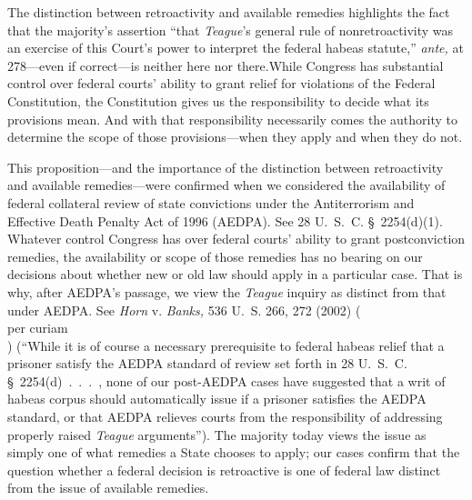 {  The distinction between retroactivity and available remedies highlights the fact that the majority's assertion ``that \emph{Teague}'s general rule of nonretroactivity was an exercise of this Court's power to interpret the federal habeas statute,'' \emph{ante,} at 278---even if correct---is neither here nor there.\footnotemark[4] \newpage While Congress has substantial control over federal courts' ability to grant relief for violations of the Federal Constitution, the Constitution gives us the responsibility to decide what its provisions mean. And with that responsibility necessarily comes the authority to determine the scope of those provisions---when they apply and when they do not.


  This proposition---and the importance of the distinction between retroactivity and available remedies---were confirmed when we considered the availability of federal collateral review of state convictions under the Antiterrorism and Effective Death Penalty Act of 1996 (AEDPA). See 28 U.~S.~C. \S~2254(d)(1). Whatever control Congress has over federal courts' ability to grant postconviction remedies, the availability or scope of those remedies has no bearing on our decisions about whether new or old law should apply in a particular case. That is why, after AEDPA's passage, we view the \emph{Teague} inquiry as distinct from that under AEDPA. See \emph{Horn} v. \emph{Banks,} 536 U.~S. 266, 272 (2002) (\\per curiam\\) (``While it is of course a necessary prerequisite to federal habeas relief that a prisoner satisfy the AEDPA standard of review set forth in 28 U.~S.~C. \S~2254(d)~.~.~.~, none of our post-AEDPA cases have suggested that a writ of habeas corpus should automatically issue if a prisoner satisfies the AEDPA standard, or that AEDPA relieves courts from the responsibility of addressing properly raised \emph{Teague} arguments''). The majority today views the issue as simply one of what remedies a State chooses to apply; our cases confirm that the question whether a federal decision is retroactive is one of federal law distinct from the issue of available remedies.

}
